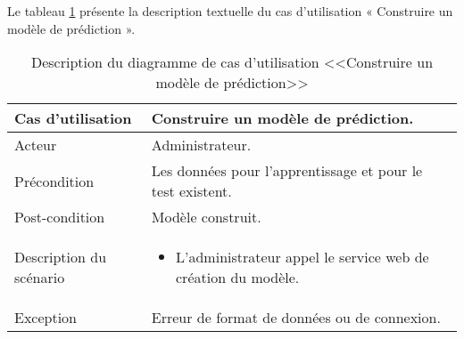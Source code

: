 Le tableau \ref{tab:modèle} présente la description textuelle du cas d’utilisation « Construire un modèle de prédiction ».
\begin{longtable}[c]{
    |p{}
    |p{}|
}
    \caption{Description du diagramme de cas d’utilisation <<Construire un modèle de prédiction>>}
    \label{tab:modèle}\\
    \hline
    
    Cas d’utilisation
    & Construire un modèle de prédiction. \\
    \hline 
    
    Acteur
    & Administrateur. \\
    \hline 
    
    Précondition
    & Les données pour l'apprentissage et pour le test existent. \\
    \hline
    
    Post-condition
    & Modèle construit. \\
    \hline
    
    Description du
scénario

    &     \begin{itemize}
    \item L’administrateur appel le service web de création du modèle.
    \end{itemize} \\
    \hline
    
   Exception
    & Erreur de format de données ou de connexion.
 \\ \hline
   
\end{longtable}



